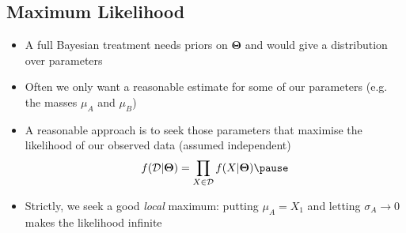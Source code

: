 
\begin{slide}
\section[-1]{Maximum Likelihood}

\begin{PauseHighLight}
  \begin{itemize}
  \item A full Bayesian treatment needs priors on $\bm{\Theta}$ and
    would give a distribution over parameters\pause
  \item Often we only want a reasonable estimate for some of our
    parameters (e.g. the masses $\mu_A$ and $\mu_B$)\pause
  \item A reasonable approach is to seek those parameters that maximise the
    likelihood of our observed data (assumed independent)
    \begin{align*}
      f(\data|\bm{\Theta}) = \prod_{X\in\data} f(X|\bm{\Theta})\pause
    \end{align*}
  \item {\small Strictly, we seek a good \emph{local} maximum: putting
      $\mu_A=X_1$ and letting $\sigma_A\to0$ makes the likelihood
      infinite}\pause
  \end{itemize}
\end{PauseHighLight}

\end{slide}


